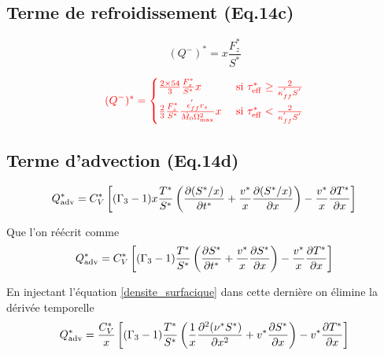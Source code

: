 \documentclass[a4paper,11pt]{article}
\begin{document}
\subsection{Terme de refroidissement (Eq.14c)}
    \begin{equation}\label{terme_de_refroidissement}
        (Q^-)^* = x \frac{F_z^*}{S^*}
    \end{equation}
    
    \begin{equation}\label{valentin terme de refroidissement}
      {\color{red}
        (Q^-)^* =
        \begin{cases}
            \frac{2\times 54}{3}\frac{F_z^*}{S^*}x & \text{ si } \tau_{\rm{eff}}^* \geq \frac{2}{\kappa_{ff}^{'} S^{'}}\\
            \frac{2}{3}\frac{F_z^*}{S^*}\frac{\epsilon_{ff}^{'}r_s}{\dot{M_0}\Omega_{\text{max}}^2}x & \text{ si } \tau_{\rm{eff}}^* < \frac{2}{\kappa_{ff}^{'} S^{'}}
        \end{cases}
        }
    \end{equation}
    
\subsection{Terme d'advection (Eq.14d)}
    \begin{equation}
        Q_{\rm{adv}}^* = C_V^* \left [ (\Gamma_3 -1) x \frac{T^*}{S^*} \left ( \frac{\partial (S^* /x)}{\partial t^*} + \frac{v^*}{x} \frac{\partial (S^* / x)}{\partial x} \right ) - \frac{v^*}{x} \frac{\partial T^*}{\partial x}  \right]
    \end{equation}
    
    Que l'on réécrit comme
    \begin{equation}
                Q_{\rm{adv}}^* = C_V^* \left [ (\Gamma_3 -1) \frac{T^*}{S^*} \left ( \frac{\partial S^* }{\partial t^*} + \frac{v^*}{x} \frac{\partial S^*}{\partial x} \right ) - \frac{v^*}{x} \frac{\partial T^*}{\partial x}  \right]
    \end{equation}
    
    En injectant l'équation \ref{densite_surfacique} dans cette dernière on élimine la dérivée temporelle
    \begin{equation}\label{terme_advection}
                Q_{\rm{adv}}^* = \frac{C_V^*}{x} \left [ (\Gamma_3 -1) \frac{T^*}{S^*} \left ( \frac{1}{x} \frac{\partial^2 (\nu^* S^*)}{\partial x^2} + v^* \frac{\partial S^*}{\partial x} \right ) - v^* \frac{\partial T^*}{\partial x}  \right]
    \end{equation}
      
\end{document}
